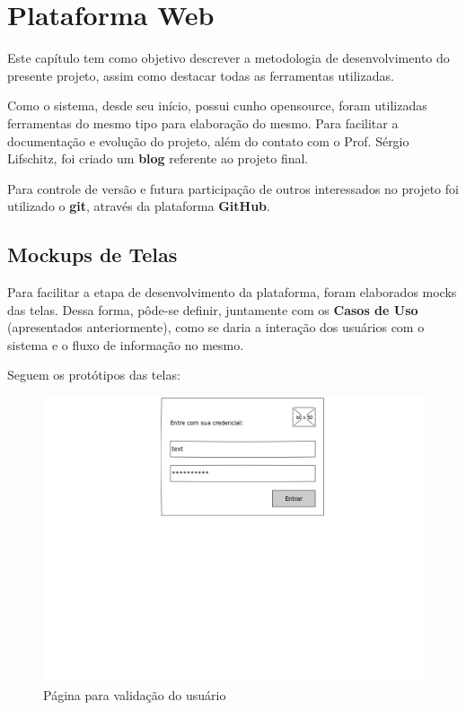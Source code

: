 \documentclass[graduacao,brazil]{ThesisPUC}
\begin{document}
\chapter{Plataforma Web}

Este cap\'{i}tulo tem como objetivo descrever a metodologia de desenvolvimento do presente projeto,
assim como destacar todas as ferramentas utilizadas.

Como o sistema, desde seu in\'{i}cio, possui cunho opensource, foram utilizadas ferramentas do mesmo
tipo para elabora\c{c}\~{a}o do mesmo. Para facilitar a documenta\c{c}\~{a}o e evolu\c{c}\~{a}o do projeto,
al\'{e}m do contato com o Prof. S\'{e}rgio Lifschitz, foi criado um \textbf{blog} referente ao projeto final.

Para controle de vers\~{a}o e futura participa\c{c}\~{a}o de outros interessados no projeto foi utilizado
o \textbf{git}, atrav\'{e}s da plataforma \textbf{GitHub}.



\section{Mockups de Telas}

Para facilitar a etapa de desenvolvimento da plataforma, foram elaborados mocks das telas.
Dessa forma, p\^{o}de-se definir, juntamente com os \textbf{Casos de Uso} (apresentados anteriormente), como
se daria a intera\c{c}\~{a}o dos usu\'{a}rios com o sistema e o fluxo de informa\c{c}\~{a}o no
mesmo.

Seguem os prot\'{o}tipos das telas:

\begin{figure}[H]
    \centering
    \includegraphics[width=\linewidth]{Imagens/LoginPage.png}
    \caption{P\'{a}gina para valida\c{c}\~{a}o do usu\'{a}rio}
\end{figure}
\end{document}
